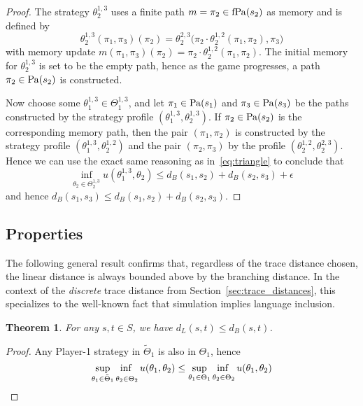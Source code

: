 \documentclass[copyright,creativecommons,sharealike]{eptcs}
\theoremstyle{plain}
\newtheorem{theorem}{Theorem}
\newcommand*\Strat{\Theta}
\newcommand*\Stratblind{\tilde \Strat}
\begin{document}
\begin{proof}
  The strategy $\theta_2^{ 1, 3}$ uses a finite path $m= \pi_2\in
  \operatorname{fPa}( s_2)$ as memory and is defined by
  \begin{equation*}
    \theta_2^{ 1, 3}( \pi_1, \pi_3)( \pi_2)= \theta_2^{ 2, 3}\big(
    \pi_2\cdot \theta_2^{ 1, 2}( \pi_1, \pi_2), \pi_3\big)
  \end{equation*}
  with memory update $m( \pi_1, \pi_3)( \pi_2)= \pi_2\cdot \theta_2^{
    1, 2}( \pi_1, \pi_2)$.  The initial memory for $\theta_2^{ 1, 3}$
  is set to be the empty path, hence as the game progresses, a path
  $\pi_2\in \operatorname{Pa}( s_2)$ is constructed.  

  Now choose some $\theta_1^{ 1, 3}\in \Theta_1^{ 1, 3}$, and let
  $\pi_1\in \operatorname{Pa}( s_1)$ and $\pi_3\in \operatorname{Pa}( s_3)$ be the paths
  constructed by the strategy profile $( \theta_1^{ 1, 3}, \theta_2^{
    1, 3})$.  If $\pi_2\in \operatorname{Pa}( s_2)$ is the corresponding memory
  path, then the pair $( \pi_1, \pi_2)$ is constructed by the strategy
  profile $( \theta_1^{ 1, 3}, \theta_2^{ 1, 2})$ and the pair $(
  \pi_2, \pi_3)$ by the profile $( \theta_2^{ 1, 2}, \theta_2^{ 2,
    3})$.  Hence we can use the exact same reasoning as
  in~\eqref{eq:triangle} to conclude that
  \begin{equation*}
    \inf_{\theta_2 \in \Strat_2^{ 1, 3}} u( \theta_1^{ 1,
      3}, \theta_2)\le d_B( s_1, s_2)+ d_B( s_2, s_3)+ \epsilon
  \end{equation*}
  and hence $d_B(s_1,s_3)\le d_B(s_1,s_2) + d_B(s_2,s_3)$.
\end{proof}

\subsection{Properties}

The following general result confirms that, regardless of the trace
distance chosen, the linear distance is always bounded above by the
branching distance.  In the context of the \emph{discrete} trace
distance from Section~\ref{sec:trace_distances}, this specializes to
the well-known fact that simulation implies language inclusion.

\begin{theorem}
  \label{thm:bound}
  For any $s, t\in S$, we have $d_L( s, t)\le d_B( s, t)$.
\end{theorem}

\begin{proof}
  Any Player-1 strategy in $\Stratblind_1$ is also in $\Strat_1$, hence
  \begin{equation*}
    \adjustlimits \sup_{ \theta_1 \in \Stratblind_1} \inf_{ \theta_2
      \in \Strat_2} u( \theta_1, \theta_2)\le \adjustlimits \sup_{ \theta_1\in \Strat_1} \inf_{ \theta_2\in
      \Strat_2} u( \theta_1, \theta_2)
  \end{equation*}
\end{proof}
\end{document}
